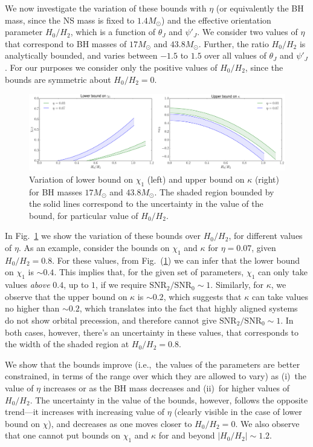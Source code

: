 We now investigate the variation of these bounds with $\eta$ (or equivalently
the BH mass, since the NS mass is fixed to $1.4M_\odot$) and the effective
orientation parameter $H_{0}/H_{2}$, which is a function of $\theta_J$ and
$\psi'_J$. We consider two values of $\eta$ that correspond to BH masses of
$17 M_\odot$ and $43.8 M_\odot$. Further, the ratio $H_{0}/H_{2}$ is
analytically bounded, and varies between $-1.5$ to $1.5$ over all values of
$\theta_J$ and $\psi'_J$. For our purposes we consider only the positive
values of $H_{0}/H_{2}$, since the bounds are symmetric about $H_0/H_2=0$.

\begin{figure}[!htbp] 
\centering
\includegraphics[width=\linewidth]{images/SM_chi_kappa_bounds.pdf}
\caption{\small{Variation of lower bound on $\chi_{1}$ (left) and upper bound on $\kappa$ (right)
for BH masses $17M_\odot$ and $43.8 M_\odot$. The shaded region bounded by the
solid lines correspond to the uncertainty in the value of the bound, for
particular value of $H_0/H_2$. }}
\label{FIG:chi_kappa_bounds}
\end{figure}

In Fig.~\ref{FIG:chi_kappa_bounds} we show the variation of these bounds over
$H_{0}/H_{2}$, for different values of $\eta$. As an example, consider the
bounds on $\chi_1$ and $\kappa$ for $\eta=0.07$, given $H_0/H_2=0.8$. 
For these values, from Fig.~(\ref{FIG:chi_kappa_bounds}) we can infer that the
lower bound on $\chi_1$  is $\sim 0.4$. This implies that, for the given set
of parameters, $\chi_1$ can only take values \textit{above} $0.4$, up to $1$,
if we require $\text{SNR}_2/\text{SNR}_0 \sim 1$. Similarly, for $\kappa$, we
observe that the upper bound on $\kappa$ is $\sim 0.2$, which suggests that
$\kappa$ can take values no higher than $\sim 0.2$, which translates into the
fact that highly aligned systems do not show orbital precession, and therefore
cannot give $\text{SNR}_2/\text{SNR}_0 \sim 1$. In both cases, however,
there's an uncertainty in these values, that corresponds to the width of the
shaded region at $H_0/H_2=0.8$.

We show that the bounds improve (i.e.,~the values of the parameters are better
constrained, in terms of the range over which they are allowed to vary) as
(i)~the value of $\eta$ increases or as the BH mass decreases and (ii)~for
higher values of $H_{0}/H_{2}$. The uncertainty in the value of the bounds,
however, follows the opposite trend---it increases with increasing value of
$\eta$ (clearly visible in the case of lower bound on $\chi$), and decreases
as one moves closer to $H_{0}/H_{2}=0$. We also observe that one cannot put
bounds on $\chi_1$ and $\kappa$ for and beyond $|H_0/H_2|\sim 1.2$.